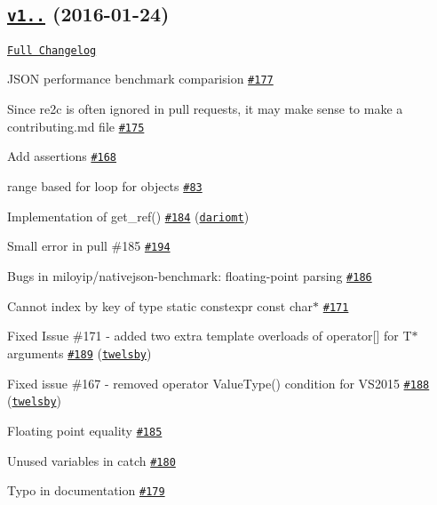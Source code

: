 \subsection*{\href{https://github.com/nlohmann/json/releases/tag/v1.1.0}{\tt v1..} (2016-\/01-\/24)}

\href{https://github.com/nlohmann/json/compare/v1.0.0...v1.1.0}{\tt Full Changelog}


\begin{DoxyItemize}
\item J\+S\+ON performance benchmark comparision \href{https://github.com/nlohmann/json/issues/177}{\tt \#177}
\item Since re2c is often ignored in pull requests, it may make sense to make a contributing.\+md file \href{https://github.com/nlohmann/json/issues/175}{\tt \#175}
\item Add assertions \href{https://github.com/nlohmann/json/issues/168}{\tt \#168}
\item range based for loop for objects \href{https://github.com/nlohmann/json/issues/83}{\tt \#83}
\item Implementation of get\+\_\+ref() \href{https://github.com/nlohmann/json/pull/184}{\tt \#184} (\href{https://github.com/dariomt}{\tt dariomt})
\item Small error in pull \#185 \href{https://github.com/nlohmann/json/issues/194}{\tt \#194}
\item Bugs in miloyip/nativejson-\/benchmark\+: floating-\/point parsing \href{https://github.com/nlohmann/json/issues/186}{\tt \#186}
\item Cannot index by key of type static constexpr const char$\ast$ \href{https://github.com/nlohmann/json/issues/171}{\tt \#171}
\item Fixed Issue \#171 -\/ added two extra template overloads of operator\mbox{[}\mbox{]} for T$\ast$ arguments \href{https://github.com/nlohmann/json/pull/189}{\tt \#189} (\href{https://github.com/twelsby}{\tt twelsby})
\item Fixed issue \#167 -\/ removed operator Value\+Type() condition for V\+S2015 \href{https://github.com/nlohmann/json/pull/188}{\tt \#188} (\href{https://github.com/twelsby}{\tt twelsby})
\item Floating point equality \href{https://github.com/nlohmann/json/issues/185}{\tt \#185}
\item Unused variables in catch \href{https://github.com/nlohmann/json/issues/180}{\tt \#180}
\item Typo in documentation \href{https://github.com/nlohmann/json/issues/179}{\tt \#179}

\end{DoxyItemize}
